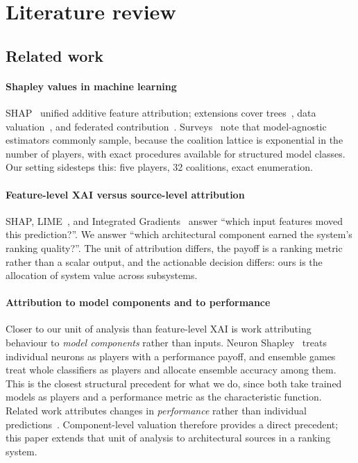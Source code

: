 \documentclass[pdflatex,sn-basic,Numbered]{sn-jnl}
\theoremstyle{plain}
\theoremstyle{definition}
\begin{document}
\section{Literature review}

\subsection{Related work}\label{sec:related}

\paragraph{Shapley values in machine learning}
SHAP~\citep{lundberg2017} unified additive feature attribution; extensions
cover trees~\citep{lundberg2020}, data valuation~\citep{ghorbani2019}, and
federated contribution~\citep{wang2020federated}.
Surveys~\citep{covert2021explaining, rozemberczki2022shapley} note that
model-agnostic estimators commonly sample, because the coalition lattice is
exponential in the number of players, with exact procedures available for
structured model classes. Our setting sidesteps this: five players,
32 coalitions, exact enumeration.

\paragraph{Feature-level XAI versus source-level attribution}
SHAP, LIME~\citep{ribeiro2016}, and Integrated
Gradients~\citep{sundararajan2017} answer ``which input features moved this
prediction?''. We answer ``which architectural component earned the system's
ranking quality?''. The unit of attribution differs, the payoff is a ranking
metric rather than a scalar output, and the actionable decision differs: ours is the allocation of system value across subsystems.

\paragraph{Attribution to model components and to performance}
Closer to our unit of analysis than feature-level XAI is work attributing
behaviour to \emph{model components} rather than inputs. Neuron
Shapley~\citep{ghorbani2020neuron} treats individual neurons as players with a
performance payoff, and ensemble games~\citep{rozemberczki2021ensemble} treat
whole classifiers as players and allocate ensemble accuracy among them. This is the closest structural precedent for what we do, since both take trained models as
players and a performance metric as the characteristic function. Related work
attributes changes in \emph{performance} rather than individual
predictions~\citep{zhang2023performance,shah2024coar}. Component-level
valuation therefore provides a direct precedent; this paper extends that unit
of analysis to architectural sources in a ranking system.
\end{document}
